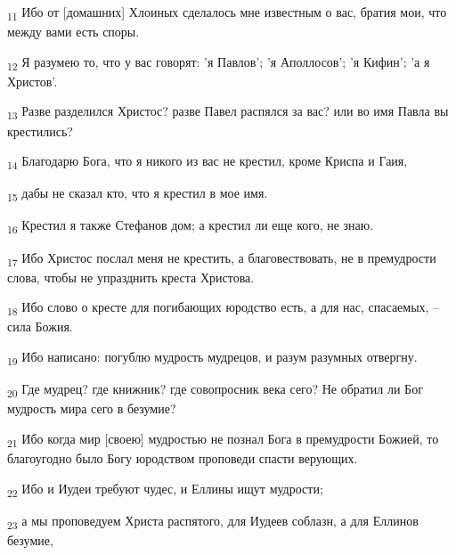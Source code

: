 \begin{tcolorbox}
\textsubscript{11} Ибо от [домашних] Хлоиных сделалось мне известным о вас, братия мои, что между вами есть споры.
\end{tcolorbox}
\begin{tcolorbox}
\textsubscript{12} Я разумею то, что у вас говорят: 'я Павлов'; 'я Аполлосов'; 'я Кифин'; 'а я Христов'.
\end{tcolorbox}
\begin{tcolorbox}
\textsubscript{13} Разве разделился Христос? разве Павел распялся за вас? или во имя Павла вы крестились?
\end{tcolorbox}
\begin{tcolorbox}
\textsubscript{14} Благодарю Бога, что я никого из вас не крестил, кроме Криспа и Гаия,
\end{tcolorbox}
\begin{tcolorbox}
\textsubscript{15} дабы не сказал кто, что я крестил в мое имя.
\end{tcolorbox}
\begin{tcolorbox}
\textsubscript{16} Крестил я также Стефанов дом; а крестил ли еще кого, не знаю.
\end{tcolorbox}
\begin{tcolorbox}
\textsubscript{17} Ибо Христос послал меня не крестить, а благовествовать, не в премудрости слова, чтобы не упразднить креста Христова.
\end{tcolorbox}
\begin{tcolorbox}
\textsubscript{18} Ибо слово о кресте для погибающих юродство есть, а для нас, спасаемых, --сила Божия.
\end{tcolorbox}
\begin{tcolorbox}
\textsubscript{19} Ибо написано: погублю мудрость мудрецов, и разум разумных отвергну.
\end{tcolorbox}
\begin{tcolorbox}
\textsubscript{20} Где мудрец? где книжник? где совопросник века сего? Не обратил ли Бог мудрость мира сего в безумие?
\end{tcolorbox}
\begin{tcolorbox}
\textsubscript{21} Ибо когда мир [своею] мудростью не познал Бога в премудрости Божией, то благоугодно было Богу юродством проповеди спасти верующих.
\end{tcolorbox}
\begin{tcolorbox}
\textsubscript{22} Ибо и Иудеи требуют чудес, и Еллины ищут мудрости;
\end{tcolorbox}
\begin{tcolorbox}
\textsubscript{23} а мы проповедуем Христа распятого, для Иудеев соблазн, а для Еллинов безумие,
\end{tcolorbox}
